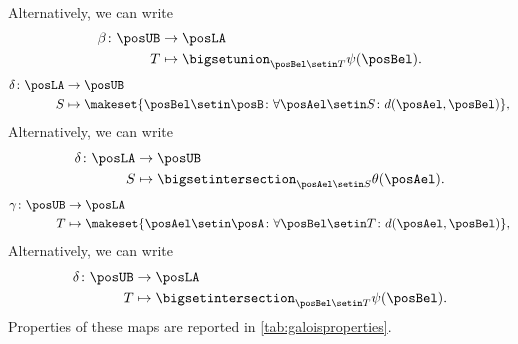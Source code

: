 {\begin{equation}
\begin{aligned}
    \end{aligned}
\end{equation}
%
\noindent Alternatively, we can write
\begin{equation}
    \begin{aligned}
        \beta \colon \posUB & \to \posLA \\
        T                   & \mapsto \bigsetunion_{\posBel\setin T} \psi(\posBel).
    \end{aligned}
\end{equation}
%
\begin{equation}
    \label{eq:galoisdelta}
    \begin{aligned}
        \delta \colon \posLA & \to \posUB \\
        S                    & \mapsto \makeset{\posBel\setin \posB \colon \forall {\posAel\setin S}\colon d(\posAel,\posBel)},
    \end{aligned}
\end{equation}
Alternatively, we can write
\begin{equation}
    \begin{aligned}
        \delta\colon \posLA & \to \posUB \\
        S                   & \mapsto \bigsetintersection_{\posAel\setin S}\theta(\posAel).
    \end{aligned}
\end{equation}
%
\begin{equation}
    \label{eq:galoisgamma}
    \begin{aligned}
        \gamma \colon \posUB & \to \posLA \\
        T                    & \mapsto \makeset{\posAel\setin \posA \colon \forall {\posBel\setin T}\colon d(\posAel,\posBel)},
    \end{aligned}
\end{equation}
Alternatively, we can write
\begin{equation}
    \begin{aligned}
        \delta\colon \posUB & \to \posLA \\
        T                   & \mapsto \bigsetintersection_{\posBel\setin T}\psi(\posBel).
    \end{aligned}
\end{equation}
%
Properties of these maps are reported in \cref{tab:galoisproperties}.

}
